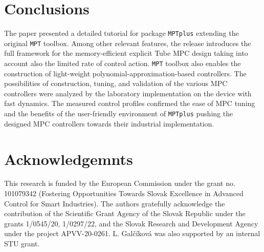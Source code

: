 \documentclass[letterpaper, 10 pt, conference]{ieeeconf}
\begin{document}
\section{Conclusions}
\label{sec:conclusions}

The paper presented a detailed tutorial for package \texttt{MPTplus} extending the original \texttt{MPT} toolbox. Among other relevant features, the release introduces the full framework for the memory-efficient explicit Tube MPC design taking into account also the limited rate of control action. \texttt{MPT} toolbox also enables the construction of light-weight polynomial-approximation-based controllers. The possibilities of construction, tuning, and validation of the various MPC controllers were analyzed by the laboratory implementation on the device with fast dynamics. The measured control profiles confirmed the ease of MPC tuning and the benefits of the user-friendly environment of \texttt{MPTplus} pushing the designed MPC controllers towards their industrial implementation.

\addtolength{\textheight}{-12cm}

\section*{Acknowledgemnts}

\small{
This research is funded by the European Commission under the grant no. 101079342 (Fostering Opportunities Towards Slovak Excellence in Advanced Control for Smart Industries). The authors gratefully acknowledge the contribution of the Scientific Grant Agency of the Slovak Republic under the grants 1/0545/20, 1/0297/22, and the Slovak Research and Development Agency under the project APVV-20-0261. L. Galčíková was also supported by an internal STU grant. 
}


\end{document}
